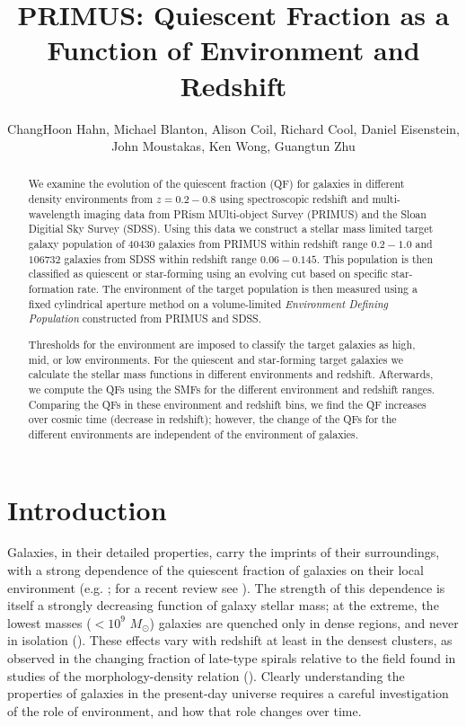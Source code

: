 \documentclass{emulateapj}
\begin{document}
\title{PRIMUS: Quiescent Fraction as a Function of Environment and Redshift}
\author{ChangHoon Hahn, Michael Blanton, Alison Coil, Richard Cool, Daniel Eisenstein, John Moustakas, Ken Wong, Guangtun Zhu}

\begin{abstract}
We examine the evolution of the quiescent fraction (QF) for galaxies in 
different density environments from $z=0.2-0.8$ using spectroscopic 
redshift and multi-wavelength imaging data from PRism MUlti-object 
Survey (PRIMUS) and the Sloan Digitial Sky Survey (SDSS). Using this 
data we construct a stellar mass limited target galaxy population of 
$40430$ galaxies from PRIMUS within redshift range $0.2-1.0$ and $106732$
galaxies from SDSS within redshift range $0.06-0.145$. This population 
is then classified as quiescent or star-forming using an evolving cut 
based on specific star-formation rate. The environment of the target 
population is then measured using a fixed cylindrical aperture method 
on a volume-limited {\em Environment Defining Population} constructed
from PRIMUS and SDSS.

Thresholds for the environment are imposed to classify the target galaxies as
high, mid, or low environments. For the quiescent and star-forming 
target galaxies we calculate the stellar mass functions in different environments and redshift.
Afterwards, we compute the QFs using the SMFs for the different environment 
and redshift ranges.  Comparing the QFs in these environment and redshift bins, we find the 
QF increases over cosmic time (decrease in redshift); however, the change of 
the QFs for the different environments are independent of the 
environment of galaxies. 
\end{abstract}

\section{Introduction}
Galaxies, in their detailed properties, carry the imprints of their
surroundings, with a strong dependence of the quiescent fraction of
galaxies on their local environment (e.g. \citealt{hubble36a,
oemler74a, dressler80a, hermit96a, guzzo97a}; for a recent review see
\citealt{blanton09a}).  The strength of this dependence is itself a
strongly decreasing function of galaxy stellar mass; at the extreme,
the lowest masses ($<10^{9}$ $M_\odot$) galaxies are quenched only in
dense regions, and never in isolation (\citealt{geha12a}).  These
effects vary with redshift at least in the densest clusters, as
observed in the changing fraction of late-type spirals relative to the
field found in studies of the morphology-density relation
(\citealt{dressler84a, desai07a}).  Clearly understanding the
properties of galaxies in the present-day universe requires a careful
investigation of the role of environment, and how that role changes
over time.
\end{document}

